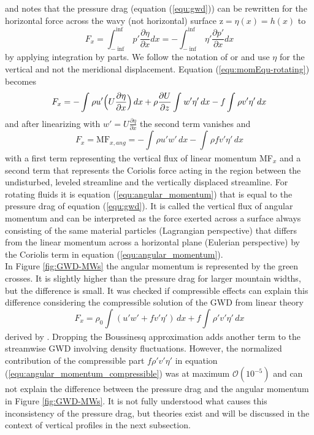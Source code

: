 and notes that the pressure drag (equation (\ref{equ:gwd})) can be rewritten for the horizontal force across the wavy (not horizontal) surface z$= \eta(x)=h(x)$ to
\begin{equation}
    F_x =  \int_{-\inf}^{\inf} p' \frac{\partial \eta}{\partial x} dx = -\int_{-\inf}^{\inf} \eta' \frac{\partial p'}{\partial x} dx
    \label{equ:pdrag-rotating}
\end{equation}
by applying integration by parts. We follow the notation of \textcite[]{smith_influence_1979} or \textcite{broad_linear_1995} and use $\eta$ for the vertical and not the meridional displacement. Equation (\ref{equ:momEqu-rotating}) becomes 
\begin{equation}
    F_x =  -\int_{}^{} \rho u' \Bigl(U \frac{\partial \eta}{\partial x}\Bigr) \, dx + \rho \frac{\partial U}{\partial z} \int_{}^{} w' \eta' \, dx  - f \int_{}^{} \rho v' \eta' \, dx 
    \label{equ:momEqu-rotating-2}
\end{equation}
and after linearizing with $w'=U\frac{\partial \eta}{\partial x}$ the second term vanishes and
\begin{equation}
    F_x = \mathrm{MF}_{x,ang} = -\int_{}^{} \rho u'w' \, dx  -  \int_{}^{} \rho f v' \eta' \, dx
    \label{equ:angular_momentum}
\end{equation}
with a first term representing the vertical flux of linear momentum MF$_x$ and a second term that represents the Coriolis force acting in the region between the undisturbed, leveled streamline and the vertically displaced streamline. For rotating fluids it is equation (\ref{equ:angular_momentum}) that is equal to the pressure drag of equation (\ref{equ:gwd}). It is called the vertical flux of angular momentum and can be interpreted as the force exerted across a surface always consisting of the same material particles (Lagrangian perspective) that differs from the linear momentum across a horizontal plane (Eulerian perspective) by the Coriolis term in equation (\ref{equ:angular_momentum}). \\
In Figure \ref{fig:GWD-MWs} the angular momentum is represented by the green crosses. It is slightly higher than the pressure drag for larger mountain widths, but the difference is small. It was checked if compressible effects can explain this difference considering the compressible solution of the GWD from linear theory 
\begin{equation}
    F_x =  \rho_0 \int_{}^{} (u'w' + f v' \eta') \, dx + f \int_{}^{} \rho' v' \eta' \, dx
    \label{equ:angular_momentum_compressible}
\end{equation}
derived by \textcite[]{broad_linear_1995}. Dropping the Boussinesq approximation adds another term to the streamwise GWD involving density fluctuations. However, the normalized contribution of the compressible part $f \rho' v' \eta'$ in equation (\ref{equ:angular_momentum_compressible}) was at maximum $\mathcal{O}(10^{-5})$ and can not explain the difference between the pressure drag and the angular momentum in Figure \ref{fig:GWD-MWs}. It is not fully understood what causes this inconsistency of the pressure drag, but theories exist and will be discussed in the context of vertical profiles in the next subsection. 

